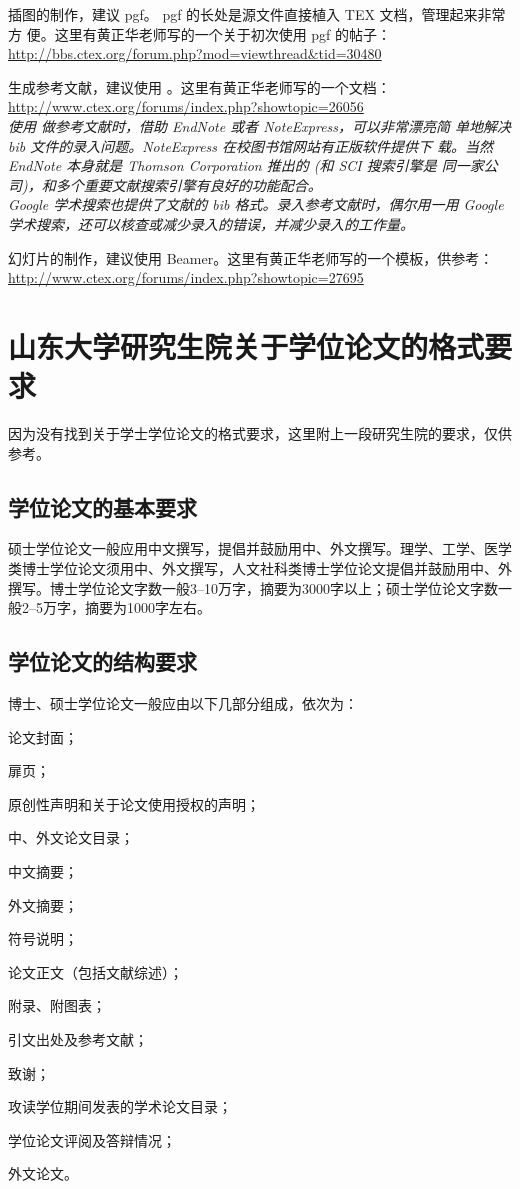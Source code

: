 \begin{compactitem}
\item 插图的制作，建议 pgf。 pgf 的长处是源文件直接植入 TEX 文档，管理起来非常方
便。这里有黄正华老师写的一个关于初次使用 pgf 的帖子：\\
\url{http://bbs.ctex.org/forum.php?mod=viewthread&tid=30480}
\item 生成参考文献，建议使用 \BibTeX{}。这里有黄正华老师写的一个文档：\\
\url{http://www.ctex.org/forums/index.php?showtopic=26056}\\
\textit{使用 \BibTeX{} 做参考文献时，借助 EndNote 或者 NoteExpress，可以非常漂亮简
单地解决 bib 文件的录入问题。NoteExpress 在校图书馆网站有正版软件提供下
载。当然 EndNote 本身就是 Thomson Corporation 推出的 (和 SCI 搜索引擎是
同一家公司)，和多个重要文献搜索引擎有良好的功能配合。}\\
\textit{Google 学术搜索也提供了文献的 bib 格式。录入参考文献时，偶尔用一用 Google
学术搜索，还可以核查或减少录入的错误，并减少录入的工作量。}
\item 幻灯片的制作，建议使用 Beamer。这里有黄正华老师写的一个模板，供参考：\\
\url{http://www.ctex.org/forums/index.php?showtopic=27695}
\end{compactitem}
\chapter{山东大学研究生院关于学位论文的格式要求}
因为没有找到关于学士学位论文的格式要求，这里附上一段研究生院的要求，仅供参考。
\section{学位论文的基本要求}
硕士学位论文一般应用中文撰写，提倡并鼓励用中、外文撰写。理学、工学、医学类博士学位论文须用中、外文撰写，人文社科类博士学位论文提倡并鼓励用中、外撰写。博士学位论文字数一般3--10万字，摘要为3000字以上；硕士学位论文字数一般2--5万字，摘要为1000字左右。
\section{学位论文的结构要求}
博士、硕士学位论文一般应由以下几部分组成，依次为：
\begin{inparaenum}
\item 论文封面；\item 扉页；\item 原创性声明和关于论文使用授权的声明；\item 中、外文论文目录；\item 中文摘要；\item 外文摘要；\item 符号说明；\item 论文正文（包括文献综述）；\item 附录、附图表；\item 引文出处及参考文献；\item 致谢；\item 攻读学位期间发表的学术论文目录；\item 学位论文评阅及答辩情况；\item 外文论文。
\end{inparaenum}
